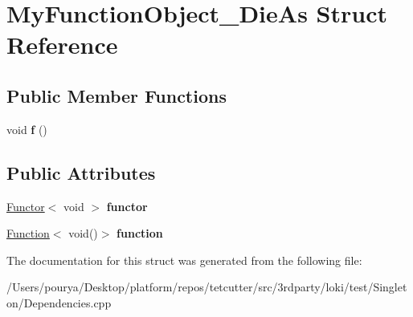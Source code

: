 \hypertarget{structMyFunctionObject__DieAs}{}\section{My\+Function\+Object\+\_\+\+Die\+As Struct Reference}
\label{structMyFunctionObject__DieAs}
\subsection*{Public Member Functions}
\begin{DoxyCompactItemize}
\item 
\hypertarget{structMyFunctionObject__DieAs_a298d53b8f30627792f22c4655c18ecbb}{}void {\bfseries f} ()\label{structMyFunctionObject__DieAs_a298d53b8f30627792f22c4655c18ecbb}

\end{DoxyCompactItemize}
\subsection*{Public Attributes}
\begin{DoxyCompactItemize}
\item 
\hypertarget{structMyFunctionObject__DieAs_a997b9d4cf847c09accbf1e184ab4dca2}{}\hyperlink{classLoki_1_1Functor}{Functor}$<$ void $>$ {\bfseries functor}\label{structMyFunctionObject__DieAs_a997b9d4cf847c09accbf1e184ab4dca2}

\item 
\hypertarget{structMyFunctionObject__DieAs_a1340749096625e850e7e47e3ed976596}{}\hyperlink{structLoki_1_1Function}{Function}$<$ void()$>$ {\bfseries function}\label{structMyFunctionObject__DieAs_a1340749096625e850e7e47e3ed976596}

\end{DoxyCompactItemize}


The documentation for this struct was generated from the following file\+:\begin{DoxyCompactItemize}
\item 
/\+Users/pourya/\+Desktop/platform/repos/tetcutter/src/3rdparty/loki/test/\+Singleton/Dependencies.\+cpp\end{DoxyCompactItemize}
